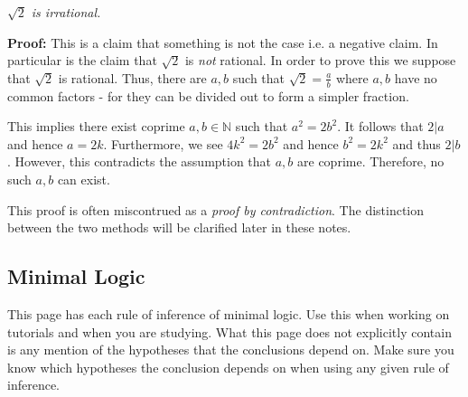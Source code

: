 \documentclass{book}
\begin{document}
    \begin{eg}
        \begin{center}
            \emph{$\sqrt{2}$ is irrational.}
        \end{center}

        {\bf Proof:} This is a claim that something is not the case i.e. a negative claim. In particular is the claim that $\sqrt{2}$ is \emph{not} rational. In order to prove this we suppose that $\sqrt{2}$ is rational. Thus, there are $a,b$ such that $\sqrt{2} = \frac{a}{b}$ where $a,b$ have no common factors - for they can be divided out to form a simpler fraction.  
        
        This implies there exist coprime $a,b \in \mathbb{N}$ such that $a^{2} = 2b^{2}$. It follows that $2 | a$ and hence $a = 2k$. Furthermore, we see $4k^{2} = 2b^{2}$ and hence $b^{2} = 2k^{2}$ and thus $2 | b$. However, this contradicts the assumption that $a,b$ are coprime. Therefore, no such $a,b$ can exist. 
    \end{eg}

    This proof is often miscontrued as a \emph{proof by contradiction}. The distinction between the two methods will be clarified later in these notes. 

    \newpage
    \subsection*{Minimal Logic}

    This page has each rule of inference of minimal logic. Use this when working on tutorials and when you are studying. What this page does not explicitly contain is any mention of the hypotheses that the conclusions depend on. Make sure you know which hypotheses the conclusion depends on when using any given rule of inference. 
\end{document}
